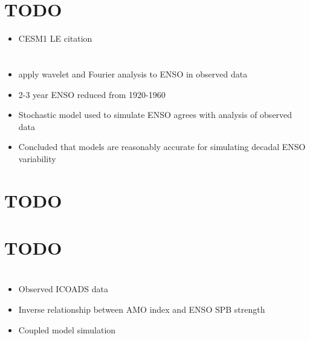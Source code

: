 \documentclass[11pt]{article}
\begin{document}
\section{{\bfseries\sffamily TODO} \cite{kay2015community}}
\label{sec:orga1c53a6}

\begin{itemize}
\item CESM1 LE citation
\end{itemize}

\section{\cite{kestin1998time}}
\label{sec:org97d4f0c}

\begin{itemize}
\item apply wavelet and Fourier analysis to ENSO in observed data
\item 2-3 year ENSO reduced from 1920-1960
\item Stochastic model used to simulate ENSO agrees with analysis of observed data
\item Concluded that models are reasonably accurate for simulating decadal ENSO variability
\end{itemize}

\section{{\bfseries\sffamily TODO} \cite{kim2014response}}
\label{sec:org4882548}
\section{{\bfseries\sffamily TODO} \cite{kohyama2018weakening}}
\label{sec:orgdf9c6cc}

\section{\cite{levine2017impact}}
\label{sec:orgea9bd4a}

\begin{itemize}
\item Observed ICOADS data
\item Inverse relationship between AMO index and ENSO SPB strength
\item Coupled model simulation
\end{itemize}

\section{\cite{lorenz1963deterministic}}
\label{sec:org9ccfa1a}
\end{document}
